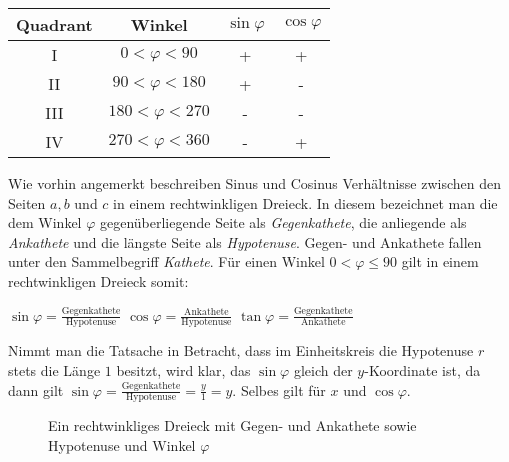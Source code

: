 \vspace{1cm}

\begin{table}[h!]
	\large
	\begin{tabular}{c | c | c | c}
		Quadrant & Winkel & $\sin \varphi$ & $\cos \varphi$
		\\ \hline
		I & $0 < \varphi < 90$ & + & +
		\\ 
		II & $90 < \varphi < 180$ & + & -
		\\
		III & $180 < \varphi < 270$ & - & -
		\\
		IV & $270 < \varphi < 360$ & - & +
		\\
	\end{tabular}
\end{table}

\pagebreak


Wie vorhin angemerkt beschreiben Sinus und Cosinus Verh\"{a}ltnisse zwischen den Seiten $a, b$ und $c$ in einem rechtwinkligen Dreieck. In diesem bezeichnet man die dem Winkel $\varphi$ gegen\"{u}berliegende Seite als \emph{Gegenkathete}, die anliegende als \emph{Ankathete} und die l\"{a}ngste Seite als \emph{Hypotenuse}. Gegen- und Ankathete fallen unter den Sammelbegriff \emph{Kathete}. F\"{u}r einen Winkel $0 < \varphi \leq 90$ gilt in einem rechtwinkligen Dreieck somit:

\begin{center}
$\sin \varphi = \frac{\text{Gegenkathete}}{\text{Hypotenuse}}$
\hspace{1cm}
$\cos \varphi = \frac{\text{Ankathete}}{\text{Hypotenuse}}$
\hspace{1cm}
$\tan \varphi = \frac{\text{Gegenkathete}}{\text{Ankathete}}$
\end{center}

Nimmt man die Tatsache in Betracht, dass im Einheitskreis die Hypotenuse $r$ stets die L\"{a}nge $1$ besitzt, wird klar, das $\sin \varphi$ gleich der $y$-Koordinate ist, da dann gilt $\sin \varphi = \frac{\text{Gegenkathete}}{\text{Hypotenuse}} = \frac{y}{1} = y$. Selbes gilt f\"{u}r $x$ und $\cos \varphi$.


\begin{figure}[h!]
	\caption*{Ein rechtwinkliges Dreieck mit Gegen- und Ankathete sowie Hypotenuse und Winkel $\varphi$}
\end{figure}

